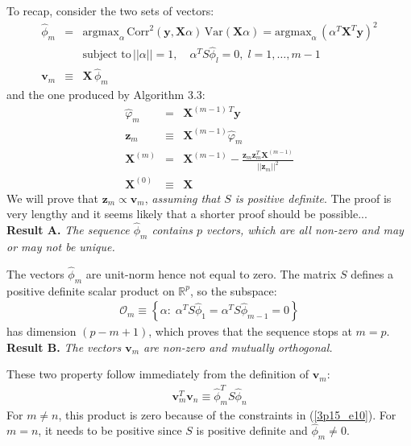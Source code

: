 To recap, consider the two sets of vectors:
\begin{eqnarray}\label{3p15_e10}
\hat{\phi}_m  & = &  \textrm{argmax}_\alpha\, \textrm{Corr}^2 \left( \mathbf{y}, \mathbf{X} \alpha \right)\, \textrm{Var} \left( \mathbf{X} \alpha \right) = \textrm{argmax}_\alpha\, \left( \alpha^T \mathbf{X}^T \mathbf{y} \right)^2\\ \nonumber
&& \textrm{subject to} \, ||\alpha|| = 1, \quad \alpha^T S \hat{\phi}_l = 0, \;l = 1, \ldots, m - 1\\
\mathbf{v}_m & \equiv & \mathbf{X}\, \hat{\phi}_m 
\end{eqnarray}
and the one produced by Algorithm 3.3:
\begin{eqnarray}
\hat{\varphi}_m & = & \mathbf{X}^{(m-1) \, T} \mathbf{y}\\
\label{3p15_3p3}
\mathbf{z}_m & \equiv & \mathbf{X}^{(m-1)} \hat{\varphi}_m \\
\label{3p15_orthRec}
\mathbf{X}^{(m)} & = & \mathbf{X}^{(m-1)} - \frac{\mathbf{z}_{m} \mathbf{z}_{m}^T \mathbf{X}^{(m - 1)}}{||\mathbf{z}_{m}||^2}\\
\mathbf{X}^{(0)} & \equiv &\mathbf{X}
\end{eqnarray}
We will prove that $\mathbf{z}_m \propto \mathbf{v}_m$, \textit{assuming that $S$ is positive definite}. The proof is very lengthy and it seems likely that a shorter
proof should be possible...
\vspace{0.5cm}\\
\noindent\textbf{Result A.} \textit{The sequence $\hat{\phi}_m$ contains $p$ vectors, which are all non-zero and 
may or may not be unique.}

\noindent The vectors $\hat{\phi}_m$ are unit-norm hence not equal to zero. The matrix $S$ defines a positive definite scalar product on $\mathbb{R}^p$, so the subspace:
\begin{eqnarray*}
\mathcal{O}_m \equiv \left\{ \alpha: \; \alpha^T S \hat{\phi} _{1} =  \alpha^T S \hat{\phi} _{ m - 1} = 0 \right\}
\end{eqnarray*}
has dimension $(p - m + 1)$, which proves that the sequence stops at $ m = p$.
\vspace{0.5cm}\\
\noindent \textbf{Result B.} \textit{The vectors $\mathbf{v}_m$ are non-zero and mutually orthogonal.}

\noindent These two property follow immediately from the definition of $\mathbf{v}_m$:
\begin{eqnarray*}
\mathbf{v}_m ^T \mathbf{v}_n \equiv \hat{\phi}_m ^T S \hat{\phi}_n
\end{eqnarray*}
For $m \neq n$, this product is zero because of the constraints in (\ref{3p15_e10}). For $m = n$,
it needs to be positive since $S$ is positive definite and $\hat{\phi}_m \neq 0$.


